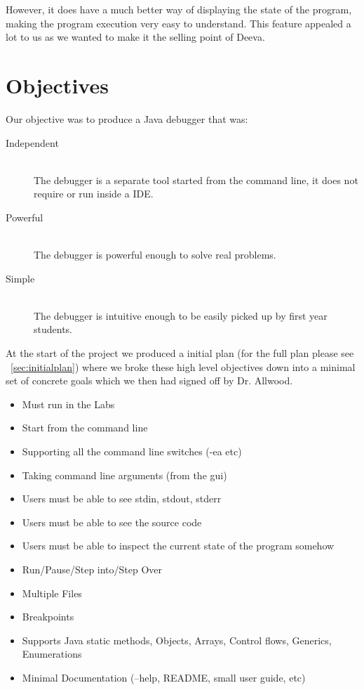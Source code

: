 \documentclass[11pt, a4paper]{article}
\begin{document}
However, it does have a much better way of displaying the state of the program, making the program execution very easy to understand. This feature appealed a lot to us as we wanted to make it the selling point of Deeva.


\section{Objectives} 

Our objective was to produce a Java debugger that was:

\begin{description}
\item[Independent] \hfill \\
The debugger is a separate tool started from the command line, it does not require or run inside a IDE.
\item[Powerful] \hfill \\
The debugger is powerful enough to solve real problems.
\item[Simple] \hfill \\
The debugger is intuitive enough to be easily picked up by first year students.
\end{description}

At the start of the project we produced a initial plan (for the full plan please see ~\cref{sec:initialplan}) where we broke these high level objectives down into a minimal set of concrete goals which we then had signed off by Dr. Allwood.

\begin{itemize}
\item Must run in the Labs
\item Start from the command line
\item Supporting all the command line switches (-ea etc)
\item Taking command line arguments (from the gui)
\item Users must be able to see stdin, stdout, stderr
\item Users must be able to see the source code
\item Users must be able to inspect the current state of the program somehow
\item Run/Pause/Step into/Step Over
\item Multiple Files
\item Breakpoints
\item Supports Java static methods, Objects, Arrays, Control flows, Generics, Enumerations
\item Minimal Documentation (--help, README, small user guide, etc)
\end{itemize}
\end{document}
